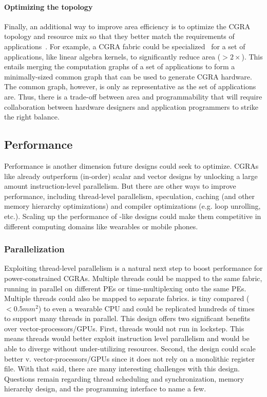 \paragraph{Optimizing the topology}
Finally, an additional way to improve area efficiency is to optimize the CGRA topology and resource mix so that they better match the requirements of applications~\cite{revamp,melchert2021automated}.
% 
For example, a CGRA fabric could be specialized~\cite{weng2020dsagen} for a set of applications, like linear algebra kernels, to significantly reduce area ($>2\times$).
% 
This entails merging the computation graphs of a set of applications to form a minimally-sized common graph that can be used to generate CGRA hardware.
% 
The common graph, however, is only as representative as the set of applications are.
% 
Thus, there is a trade-off between area and programmability that will require collaboration between hardware designers and application programmers to strike the right balance.

\subsection{Performance}
Performance is another dimension future designs could seek to optimize.
% 
CGRAs like \riptide already outperform (in-order) scalar and vector designs by unlocking a large amount instruction-level parallelism.
% 
But there are other ways to improve performance, including thread-level parallelism, speculation, caching (and other memory hierarchy optimizations) and compiler optimizations (e.g. loop unrolling, etc.).
% 
Scaling up the performance of \riptide-like designs could make them competitive in different computing domains like wearables or mobile phones.

\subsubsection{Parallelization}
Exploiting thread-level parallelism is a natural next step to boost performance for power-constrained CGRAs.
% 
Multiple threads could be mapped to the same fabric, running in parallel on different PEs or time-multiplexing onto the same PEs.
%
Multiple threads could also be mapped to separate fabrics. 
% 
\riptide is tiny compared ($<0.5mm^2$) to even a wearable CPU and could be replicated hundreds of times to support many threads in parallel.
% 
This design offers two significant benefits over vector-processors/GPUs.
% 
First, threads would not run in lockstep.
This means threads would better exploit instruction level parallelism and would be able to diverge without under-utilizing resources.
Second, the design could scale better v. vector-processors/GPUs since it does not rely on a monolithic register file.
% 
With that said, there are many interesting challenges with this design.
% 
Questions remain regarding thread scheduling and synchronization, memory hierarchy design, and the programming interface to name a few.

